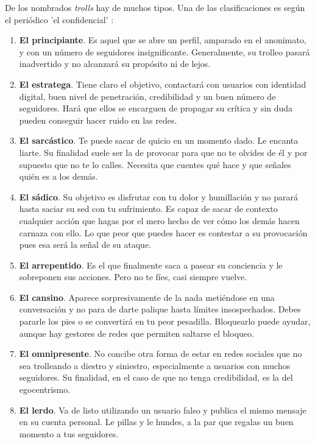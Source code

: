 \documentclass[../all.tex]{subfiles}
\begin{document}
    \newline
    De los nombrados \textit{trolls} hay de muchos tipos. Una de las clasificaciones es según el periódico 'el confidencial' \cite{relacionado6}:
    \begin{enumerate}[resume]
        \item \textbf{El principiante}. Es aquel que se abre un perfil, amparado en el anonimato, y con un número de seguidores insignificante. Generalmente, su trolleo pasará inadvertido y no alcanzará su propósito ni de lejos.
        \item \textbf{El estratega}. Tiene claro el objetivo, contactará con usuarios con identidad digital, buen nivel de penetración, credibilidad y un buen número de seguidores. Hará que ellos se encarguen de propagar su crítica y sin duda pueden conseguir hacer ruido en las redes.
        \item \textbf{El sarcástico}. Te puede sacar de quicio en un momento dado. Le encanta liarte. Su finalidad suele ser la de provocar para que no te olvides de él y por supuesto que no te lo calles. Necesita que cuentes qué hace y que señales quién es a los demás.
        \item \textbf{El sádico}. Su objetivo es disfrutar con tu dolor y humillación y no parará hasta saciar su sed con tu sufrimiento. Es capaz de sacar de contexto cualquier acción que hagas por el mero hecho de ver cómo los demás hacen carnaza con ello. Lo que peor que puedes hacer es contestar a su provocación pues esa será la señal de su ataque.
        \item \textbf{El arrepentido}. Es el que finalmente saca a pasear su conciencia y le sobreponen sus acciones. Pero no te fíes, casi siempre vuelve.
        \item \textbf{El cansino}. Aparece sorpresivamente de la nada metiéndose en una conversación y no para de darte palique hasta límites insospechados. Debes pararle los pies o se convertirá en tu peor pesadilla. Bloquearlo puede ayudar, aunque hay gestores de redes que permiten saltarse el bloqueo.
        \item \textbf{El omnipresente}. No concibe otra forma de estar en redes sociales que no sea trolleando a diestro y siniestro, especialmente a usuarios con muchos seguidores. Su finalidad, en el caso de que no tenga credibilidad, es la del egocentrismo.
        \item \textbf{El lerdo}. Va de listo utilizando un usuario falso y publica el mismo mensaje en su cuenta personal. Le pillas y le hundes, a la par que regalas un buen momento a tus seguidores.

\end{enumerate}
\end{document}
